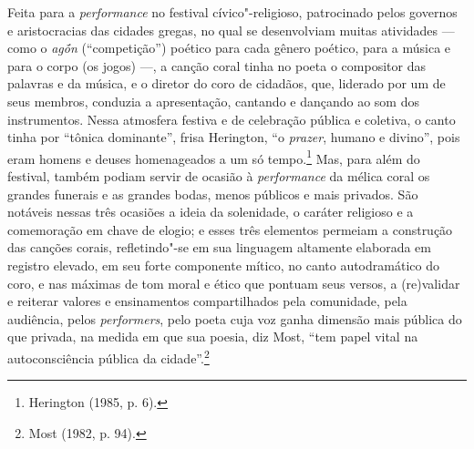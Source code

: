 Feita para a \textit{performance} no festival cívico"-religioso, patrocinado
pelos governos e aristocracias das cidades gregas, no qual se
desenvolviam muitas atividades --- como o \textit{agṓn} (“competição”) poético
para cada gênero poético, para a música e para o corpo (os jogos) \mbox{---,} a canção coral tinha no poeta o compositor das palavras e
da música, e o diretor do coro de cidadãos, que, liderado por um de seus
membros, conduzia a apresentação, cantando e dançando ao som dos instrumentos.
Nessa atmosfera festiva e de celebração pública e coletiva, o canto tinha por
“tônica dominante”, frisa Herington, “o \textit{prazer}, humano e
divino”, pois eram homens e deuses homenageados a um só tempo.\footnote{ Herington (1985, p. 6).} Mas, para além
do festival, também podiam servir de ocasião à
\textit{performance} da mélica coral os grandes funerais e as grandes bodas,
menos públicos e mais privados. São notáveis nessas três ocasiões a ideia da
solenidade, o caráter religioso e a comemoração em chave de elogio; e esses
três elementos permeiam a construção das canções corais, refletindo"-se
em sua linguagem altamente elaborada em registro elevado, em seu forte
componente mítico, no canto autodramático do coro, e nas máximas de tom moral
e ético que pontuam seus versos, a (re)validar e reiterar valores e
ensinamentos compartilhados pela comunidade, pela audiência, pelos
\textit{performers}, pelo poeta cuja voz ganha dimensão mais
pública do que privada, na medida em que sua poesia, diz Most,
“tem papel vital na autoconsciência pública da cidade”.\footnote{ Most (1982, p. 94).}

